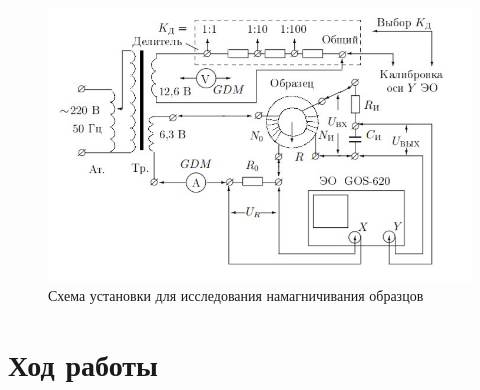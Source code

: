 \documentclass[a4paper]{article}
\begin{document}
\begin{figure}[H]
	\centering
	\includegraphics[width=\linewidth]{gist.jpg}
	\caption{Схема установки для исследования намагничивания образцов}
	\label{fig:Holl2}
\end{figure}


\section{Ход работы}
\end{document}
